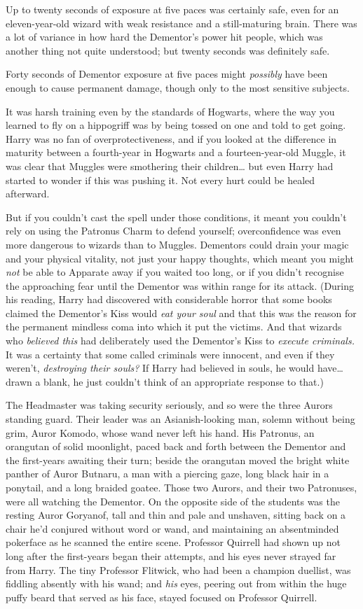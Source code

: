 Up to twenty seconds of exposure at five paces was certainly safe, even
for an eleven-year-old wizard with weak resistance and a still-maturing
brain. There was a lot of variance in how hard the Dementor's power hit
people, which was another thing not quite understood; but twenty seconds
was definitely safe.

Forty seconds of Dementor exposure at five paces might \emph{possibly}
have been enough to cause permanent damage, though only to the most
sensitive subjects.

It was harsh training even by the standards of Hogwarts, where the way
you learned to fly on a hippogriff was by being tossed on one and told
to get going. Harry was no fan of overprotectiveness, and if you looked
at the difference in maturity between a fourth-year in Hogwarts and a
fourteen-year-old Muggle, it was clear that Muggles were smothering
their children\ldots{} but even Harry had started to wonder if this was
pushing it. Not every hurt could be healed afterward.

But if you couldn't cast the spell under those conditions, it meant you
couldn't rely on using the Patronus Charm to defend yourself;
overconfidence was even more dangerous to wizards than to Muggles.
Dementors could drain your magic and your physical vitality, not just
your happy thoughts, which meant you might \emph{not} be able to
Apparate away if you waited too long, or if you didn't recognise the
approaching fear until the Dementor was within range for its attack.
(During his reading, Harry had discovered with considerable horror that
some books claimed the Dementor's Kiss would \emph{eat your soul} and
that this was the reason for the permanent mindless coma into which it
put the victims. And that wizards who \emph{believed this} had
deliberately used the Dementor's Kiss to \emph{execute criminals.} It
was a certainty that some called criminals were innocent, and even if
they weren't, \emph{destroying their souls?} If Harry had believed in
souls, he would have\ldots{} drawn a blank, he just couldn't think of an
appropriate response to that.)

The Headmaster was taking security seriously, and so were the three
Aurors standing guard. Their leader was an Asianish-looking man, solemn
without being grim, Auror Komodo, whose wand never left his hand. His
Patronus, an orangutan of solid moonlight, paced back and forth between
the Dementor and the first-years awaiting their turn; beside the
orangutan moved the bright white panther of Auror Butnaru, a man with a
piercing gaze, long black hair in a ponytail, and a long braided goatee.
Those two Aurors, and their two Patronuses, were all watching the
Dementor. On the opposite side of the students was the resting Auror
Goryanof, tall and thin and pale and unshaven, sitting back on a chair
he'd conjured without word or wand, and maintaining an absentminded
pokerface as he scanned the entire scene. Professor Quirrell had shown
up not long after the first-years began their attempts, and his eyes
never strayed far from Harry. The tiny Professor Flitwick, who had been
a champion duellist, was fiddling absently with his wand; and \emph{his}
eyes, peering out from within the huge puffy beard that served as his
face, stayed focused on Professor Quirrell.


